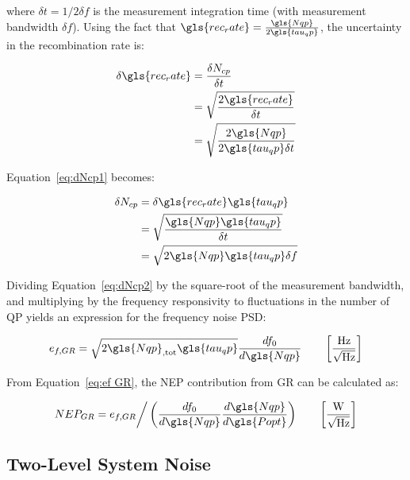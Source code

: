 where $\delta t = 1/2 \delta f$ is the measurement integration time (with measurement bandwidth $\delta f$). Using the fact that $\gls{rec_rate} = \frac{\gls{Nqp}}{2\gls{tau_qp}}$, the uncertainty in the recombination rate is:

\begin{equation}
  \begin{aligned}
  \delta \gls{rec_rate} &= \frac{\delta N_{cp}}{\delta t} \\
                        &= \sqrt{ \frac{2\gls{rec_rate}}{\delta t}} \\
                        &= \sqrt{ \frac{2\gls{Nqp}}{2\gls{tau_qp}\delta t} }
  \end{aligned}
\end{equation}

Equation~\ref{eq:dNcp1} becomes:

\begin{equation}\label{eq:dNcp2}
  \begin{aligned}
  \delta N_{cp} &= \delta \gls{rec_rate} \gls{tau_qp} \\
                &= \sqrt{ \frac{\gls{Nqp} \gls{tau_qp}}{\delta t} } \\
                &= \sqrt{2\gls{Nqp}\gls{tau_qp} \delta f}
  \end{aligned}
\end{equation}

Dividing Equation~\ref{eq:dNcp2} by the square-root of the measurement bandwidth, and multiplying by the frequency responsivity to fluctuations in the number of QP yields an expression for the frequency noise PSD\@:

\begin{equation} \label{eq:ef GR}
e_{f,GR} = \sqrt{2 \gls{Nqp}_{\mathrm{,tot}}\gls{tau_qp}}\frac{df_{0}}{d\gls{Nqp}}
\qquad \left[ \frac{\mathrm{Hz}}{\sqrt{\mathrm{Hz}}} \right]
\end{equation}

From Equation~\ref{eq:ef GR}, the NEP contribution from GR can be calculated as:

\begin{equation} \label{eq:NEP GR}
  NEP_{GR} = e_{f,GR} \bigg/ \left( \frac{df_{0}}{d\gls{Nqp}}\frac{d\gls{Nqp}}{d\gls{Popt}} \right) \qquad \left[ \frac{\mathrm{W}}{\sqrt{\mathrm{Hz}}} \right]
\end{equation}

\subsection{Two-Level System Noise}\label{ssec:TLS}

